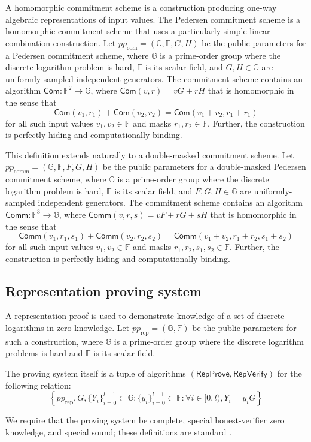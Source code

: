 \documentclass{llncs}
\newcommand{\G}{\mathbb{G}}
\newcommand{\F}{\mathbb{F}}
\newcommand{\func}[1]{\mathsf{#1}}
\newcommand{\com}{\func{Com}}
\newcommand{\comm}{\func{Comm}}
\begin{document}
A homomorphic commitment scheme is a construction producing one-way algebraic representations of input values.
The Pedersen commitment scheme is a homomorphic commitment scheme that uses a particularly simple linear combination construction.
Let $pp_{\text{com}} = (\G, \F, G, H)$ be the public parameters for a Pedersen commitment scheme, where $\G$ is a prime-order group where the discrete logarithm problem is hard, $\F$ is its scalar field, and $G,H \in \G$ are uniformly-sampled independent generators.
The commitment scheme contains an algorithm $\com: \F^2 \to \G$, where $\com(v,r) = vG + rH$ that is homomorphic in the sense that $$\com(v_1,r_1) + \com(v_2,r_2) = \com(v_1 + v_2,r_1 + r_1)$$ for all such input values $v_1,v_2 \in \F$ and masks $r_1,r_2 \in \F$.
Further, the construction is perfectly hiding and computationally binding.

This definition extends naturally to a double-masked commitment scheme.
Let $pp_{\text{comm}} = (\G, \F, F, G, H)$ be the public parameters for a double-masked Pedersen commitment scheme, where $\G$ is a prime-order group where the discrete logarithm problem is hard, $\F$ is its scalar field, and $F,G,H \in \G$ are uniformly-sampled independent generators.
The commitment scheme contains an algorithm $\comm: \F^3 \to \G$, where $\comm(v,r,s) = vF + rG + sH$ that is homomorphic in the sense that $$\comm(v_1,r_1,s_1) + \comm(v_2,r_2,s_2) = \comm(v_1 + v_2,r_1 + r_2,s_1 + s_2)$$ for all such input values $v_1,v_2 \in \F$ and masks $r_1,r_2,s_1,s_2 \in \F$.
Further, the construction is perfectly hiding and computationally binding.


\subsection{Representation proving system}

A representation proof is used to demonstrate knowledge of a set of discrete logarithms in zero knowledge.
Let $pp_{\text{rep}} = (\G, \F)$ be the public parameters for such a construction, where $\G$ is a prime-order group where the discrete logarithm problems is hard and $\F$ is its scalar field.

The proving system itself is a tuple of algorithms $(\func{RepProve},\func{RepVerify})$ for the following relation:
$$\left\{ pp_{\text{rep}}, G, \{Y_i\}_{i=0}^{l-1} \subset \G ; \{y_i\}_{i=0}^{l-1} \subset \F : \forall i \in [0,l), Y_i = y_i G \right\}$$

We require that the proving system be complete, special honest-verifier zero knowledge, and special sound; these definitions are standard \cite{groth}.
\end{document}
